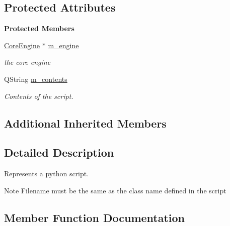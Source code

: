 \subsection*{Protected Attributes}
\begin{Indent}\textbf{ Protected Members}\par
\begin{DoxyCompactItemize}
\item 
\mbox{\label{classrev_1_1_python_script_a8ba49bbe5560857b80e1fd08128842b0}} 
\mbox{\hyperlink{classrev_1_1_core_engine}{Core\+Engine}} $\ast$ \mbox{\hyperlink{classrev_1_1_python_script_a8ba49bbe5560857b80e1fd08128842b0}{m\+\_\+engine}}
\begin{DoxyCompactList}\small\item\em the core engine \end{DoxyCompactList}\item 
\mbox{\label{classrev_1_1_python_script_ab860877cac2dcfc777c91e79967d4704}} 
Q\+String \mbox{\hyperlink{classrev_1_1_python_script_ab860877cac2dcfc777c91e79967d4704}{m\+\_\+contents}}
\begin{DoxyCompactList}\small\item\em Contents of the script. \end{DoxyCompactList}\end{DoxyCompactItemize}
\end{Indent}
\subsection*{Additional Inherited Members}


\subsection{Detailed Description}
Represents a python script. 

\begin{DoxyNote}{Note}
Filename must be the same as the class name defined in the script 
\end{DoxyNote}


\subsection{Member Function Documentation}
\mbox{\label{classrev_1_1_python_script_ac593ea8f3beeb031d81837b1306bf6ba}} 
